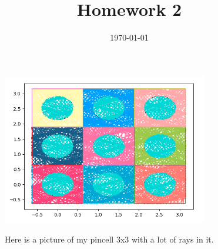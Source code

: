 \documentclass[a4paper]{article}
\title{Homework 2}
\date{\today}
\begin{document}
\maketitle



\begin{figure}[H]
\centering
\includegraphics[width=0.8\textwidth]{raysPic}
  \caption{\label{fig:fig1}} Here is a picture of my pincell 3x3 with a lot of rays in it.
\end{figure}







%
\end{document}
